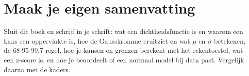 \ifzelfstudie
\section*{Maak je eigen samenvatting}
Sluit dit boek en schrijf in je schrift: wat een dichtheidsfunctie is en waarom een kans een oppervlakte is, hoe de Gausskromme eruitziet en wat $\mu$ en $\sigma$ betekenen, de 68-95-99,7-regel, hoe je kansen en grenzen berekent met het rekentoestel, wat een z-score is, en hoe je beoordeelt of een normaal model bij data past. Vergelijk daarna met de kaders.
\fi

